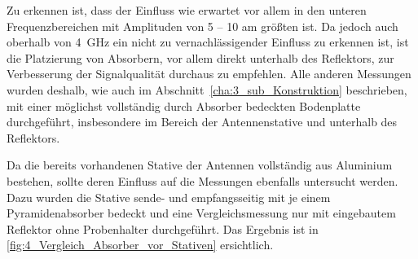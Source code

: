 Zu erkennen ist, dass der Einfluss wie erwartet vor allem in den unteren Frequenzbereichen mit \mbox{Amplituden} von 5 -- \SI{10}{\Dezibel} am größten ist. Da jedoch auch oberhalb von \SI{4}{\giga\hertz} ein nicht zu vernachlässigender Einfluss zu erkennen ist, ist die Platzierung von Absorbern, vor allem direkt unterhalb des Reflektors, zur Verbesserung der Signalqualität durchaus zu empfehlen. Alle anderen Messungen wurden deshalb, wie auch im Abschnitt~\ref{cha:3_sub_Konstruktion} beschrieben, mit einer möglichst vollständig durch Absorber bedeckten Bodenplatte durchgeführt, insbesondere im Bereich der Antennenstative und unterhalb des Reflektors.
\par
\vspace{\linespace}
Da die bereits vorhandenen Stative der Antennen vollständig aus Aluminium bestehen, sollte deren Einfluss auf die Messungen ebenfalls untersucht werden. Dazu wurden die Stative sende- und empfangsseitig mit je einem Pyramidenabsorber bedeckt und eine Vergleichsmessung nur mit eingebautem Reflektor ohne Probenhalter durchgeführt. Das Ergebnis ist in \Abb\ref{fig:4_Vergleich_Absorber_vor_Stativen} ersichtlich.
\par
\vspace{\linespace}



